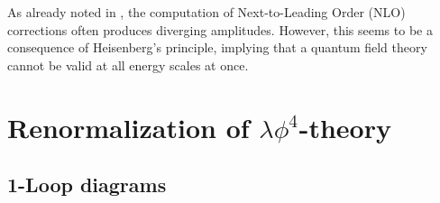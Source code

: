 
As already noted in , the computation of Next-to-Leading Order (NLO) corrections often produces diverging amplitudes. However, this seems to be a consequence of Heisenberg's principle, implying that a quantum field theory cannot be valid at all energy scales at once.

\section{Renormalization of \texorpdfstring{$ \lambda \phi^4 $}{λφ4}-theory}

\subsection{1-Loop diagrams}
\label{ssec:f4-1-loop}

